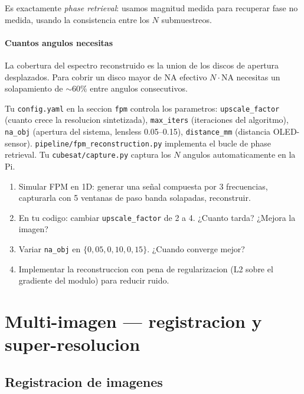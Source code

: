 \documentclass[11pt,a4paper,twoside,openright]{book}
\begin{document}
Es exactamente \emph{phase retrieval}: usamos magnitud medida para recuperar fase no medida, usando la consistencia entre los $N$ submuestreos.

\subsection{Cuantos angulos necesitas}

La cobertura del espectro reconstruido es la union de los discos de apertura desplazados. Para cobrir un disco mayor de NA efectivo $N \cdot \mathrm{NA}$ necesitas un solapamiento de $\sim 60\%$ entre angulos consecutivos.

\begin{pipeline}
Tu \texttt{config.yaml} en la seccion \texttt{fpm} controla los parametros: \texttt{upscale\_factor} (cuanto crece la resolucion sintetizada), \texttt{max\_iters} (iteraciones del algoritmo), \texttt{na\_obj} (apertura del sistema, lensless 0.05--0.15), \texttt{distance\_mm} (distancia OLED-sensor). \texttt{pipeline/fpm\_reconstruction.py} implementa el bucle de phase retrieval. Tu \texttt{cubesat/capture.py} captura los $N$ angulos automaticamente en la Pi.
\end{pipeline}

\begin{ejercicio}
\begin{enumerate}[leftmargin=2em]
  \item Simular FPM en 1D: generar una señal compuesta por 3 frecuencias, capturarla con 5 ventanas de paso banda solapadas, reconstruir.
  \item En tu codigo: cambiar \texttt{upscale\_factor} de 2 a 4. ¿Cuanto tarda? ¿Mejora la imagen?
  \item Variar \texttt{na\_obj} en $\{0{,}05, 0{,}10, 0{,}15\}$. ¿Cuando converge mejor?
  \item Implementar la reconstruccion con pena de regularizacion (L2 sobre el gradiente del modulo) para reducir ruido.
\end{enumerate}
\end{ejercicio}

\part{Multi-imagen --- registracion y super-resolucion}

\chapter{Registracion de imagenes}
\label{ch:registracion}
\end{document}
